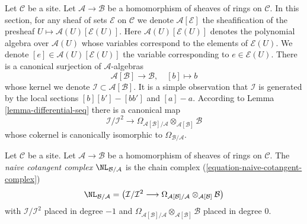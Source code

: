 \medskip\noindent
Let $\mathcal{C}$ be a site. Let $\mathcal{A} \to \mathcal{B}$ be a
homomorphism of sheaves of rings on $\mathcal{C}$. In this section,
for any sheaf of sets $\mathcal{E}$ on $\mathcal{C}$ we denote
 $\mathcal{A}[\mathcal{E}]$ the sheafification
of the presheaf $U \mapsto \mathcal{A}(U)[\mathcal{E}(U)]$. Here
$\mathcal{A}(U)[\mathcal{E}(U)]$
denotes the polynomial algebra over $\mathcal{A}(U)$
whose variables correspond to the elements of $\mathcal{E}(U)$.
We denote $[e] \in \mathcal{A}(U)[\mathcal{E}(U)]$ the variable
corresponding to $e \in \mathcal{E}(U)$.
There is a canonical surjection of $\mathcal{A}$-algebras
\begin{equation}
\label{equation-canonical-presentation}
\mathcal{A}[\mathcal{B}] \longrightarrow \mathcal{B},\quad [b] \longmapsto b
\end{equation}
whose kernel we denote $\mathcal{I} \subset \mathcal{A}[\mathcal{B}]$.
It is a simple observation that $\mathcal{I}$ is generated by the
local sections $[b][b'] - [bb']$ and $[a] - a$. According to
Lemma \ref{lemma-differential-seq} there is a canonical map
\begin{equation}
\label{equation-naive-cotangent-complex}
\mathcal{I}/\mathcal{I}^2
\longrightarrow
\Omega_{\mathcal{A}[\mathcal{B}]/\mathcal{A}}
\otimes_{\mathcal{A}[\mathcal{B}]} \mathcal{B}
\end{equation}
whose cokernel is canonically isomorphic to $\Omega_{\mathcal{B}/\mathcal{A}}$.

\begin{definition}
\label{definition-naive-cotangent-complex}
Let $\mathcal{C}$ be a site. Let $\mathcal{A} \to \mathcal{B}$ be a
homomorphism of sheaves of rings on $\mathcal{C}$.
The {\it naive cotangent complex} $\NL_{\mathcal{B}/\mathcal{A}}$
is the chain complex (\ref{equation-naive-cotangent-complex})
$$
\NL_{\mathcal{B}/\mathcal{A}} =
\left(\mathcal{I}/\mathcal{I}^2
\longrightarrow
\Omega_{\mathcal{A}[\mathcal{B}]/\mathcal{A}}
\otimes_{\mathcal{A}[\mathcal{B}]} \mathcal{B}\right)
$$
with $\mathcal{I}/\mathcal{I}^2$ placed in degree $-1$ and
$\Omega_{\mathcal{A}[\mathcal{B}]/\mathcal{A}}
\otimes_{\mathcal{A}[\mathcal{B}]} \mathcal{B}$
placed in degree $0$.
\end{definition}

